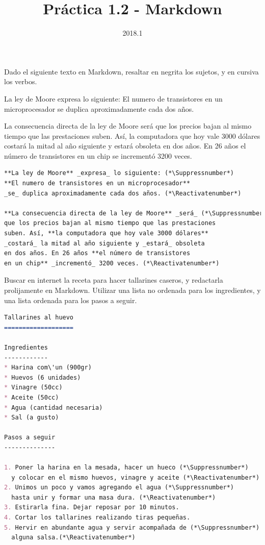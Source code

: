\documentclass[12pt, addpoints]{../../common/epyl_exam_template}
\title{Práctica 1.2 - Markdown}
\date{2018.1}
\begin{document}
\makeexamheader
\makeexamtitle
\examrule

\begin{questions}
  \question
    Dado el siguiente texto en Markdown, resaltar en negrita los sujetos, y
    en cursiva los verbos.
    \begin{quoted}
      La ley de Moore expresa lo siguiente:
      El numero de transistores en un microprocesador se duplica aproximadamente
      cada dos años.

      La consecuencia directa de la ley de Moore será que los precios bajan al
      mismo tiempo que las prestaciones suben. Así, la computadora que hoy
      vale 3000 dólares costará la mitad al año siguiente y estará obsoleta en
      dos años. En 26 años el número de transistores en un chip se
      incrementó 3200 veces.
    \end{quoted}

    \begin{solution}
      \begin{lstlisting}[language=Markdown]
**La ley de Moore** _expresa_ lo siguiente: (*\Suppressnumber*)
**El numero de transistores en un microprocesador**
_se_ duplica aproximadamente cada dos años. (*\Reactivatenumber*)

**La consecuencia directa de la ley de Moore** _será_ (*\Suppressnumber*)
que los precios bajan al mismo tiempo que las prestaciones
suben. Así, **la computadora que hoy vale 3000 dólares**
_costará_ la mitad al año siguiente y _estará_ obsoleta
en dos años. En 26 años **el número de transistores
en un chip** _incrementó_ 3200 veces. (*\Reactivatenumber*)
      \end{lstlisting}
    \end{solution}

  \question
    Buscar en internet la receta para hacer tallarines caseros, y redactarla
    prolijamente en Markdown. Utilizar una lista no ordenada para los
    ingredientes, y una lista ordenada para los pasos a seguir.

    \begin{solution}
      \begin{lstlisting}[language=Markdown]
Tallarines al huevo
===================

Ingredientes
------------
* Harina com\'un (900gr)
* Huevos (6 unidades)
* Vinagre (50cc)
* Aceite (50cc)
* Agua (cantidad necesaria)
* Sal (a gusto)

Pasos a seguir
--------------

1. Poner la harina en la mesada, hacer un hueco (*\Suppressnumber*)
  y colocar en el mismo huevos, vinagre y aceite (*\Reactivatenumber*)
2. Unimos un poco y vamos agregando el agua (*\Suppressnumber*)
  hasta unir y formar una masa dura. (*\Reactivatenumber*)
3. Estirarla fina. Dejar reposar por 10 minutos.
4. Cortar los tallarines realizando tiras pequeñas.
5. Hervir en abundante agua y servir acompañada de (*\Suppressnumber*)
  alguna salsa.(*\Reactivatenumber*)
      \end{lstlisting}
    \end{solution}


\end{questions}
\end{document}
